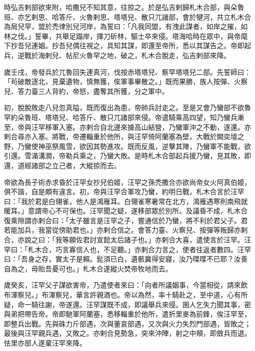 \begin{pinyinscope}
 時弘吉剌部欲來附，哈撒兒不知其意，往掠之。於是弘吉剌歸札木合部，與朵魯班、亦乞剌思、哈答斤、火魯剌思、塔塔兒、散只兀諸部，會於犍河，共立札木合為局兒罕，盟於禿律別兒河岸，為誓曰：「凡我同盟，有洩此謀者，如岸之摧，如林之伐。」誓畢，共舉足蹋岸，揮刀斫林，驅士卒來侵。塔海哈時在眾中，與帝麾下抄吾兒連姻。抄吾兒偶往視之，具知其謀，即還至帝所，悉以其謀告之。帝即起兵，逆戰於海剌兒、帖尼火魯罕之地，破之，札木合脫走，弘吉剌部來降。



 歲壬戌，帝發兵於兀魯回失連真河，伐按赤塔塔兒、察罕塔塔兒二部。先誓師曰：「茍破敵逐北，見棄遺物，慎無獲，俟軍事畢散之。」既而果勝，族人按彈、火察兒、答力臺三人背約，帝怒，盡奪其所獲，分之軍中。



 初，脫脫敗走八兒忽真隘，既而復出為患，帝帥兵討走之。至是又會乃蠻部不欲魯罕約朵魯班、塔塔兒、哈答斤、散只兀諸部來侵。帝遣騎乘高四望，知乃蠻兵漸至，帝與汪罕移軍入塞。亦剌合自北邊來據高山結營，乃蠻軍沖之不動，遂還。亦剌合尋亦入塞。將戰，帝遷輜重於他所，與汪罕倚阿蘭塞為壁，大戰於闕奕壇之野，乃蠻使神巫祭風雪，欲因其勢進攻。既而反風，逆擊其陣，乃蠻軍不能戰，欲引還。雪滿溝澗，帝勒兵乘之，乃蠻大敗。是時札木合部起兵援乃蠻，見其敗，即還，道經諸部之立己者，大縱掠而去。



 帝欲為長子術赤求昏於汪罕女抄兒伯姬，汪罕之孫禿撒合亦欲尚帝女火阿真伯姬，俱不諧，自是頗有違言。初，帝與汪罕合軍攻乃蠻，約明日戰，札木合言於汪罕曰：「我於君是白翎雀，他人是鴻雁耳。白翎雀寒暑常在北方，鴻雁遇寒則南飛就暖耳。」意謂帝心不可保也。汪罕聞之疑，遂移部眾於別所。及議昏不成，札木合復乘隙謂亦剌合曰：「太子雖言是汪罕之子，嘗通信於乃蠻，將不利於君父子。君若能加兵，我當從傍助君也。」亦剌合信之。會答力臺、火察兒、按彈等叛歸亦剌合，亦說之曰：「我等願佐君討宣懿太后諸子也。」亦剌合大喜，遣使言於汪罕。汪罕曰：「札木合，巧言寡信人也，不足聽。」亦剌合力言之，使者往返者數四。汪罕曰：「吾身之存，實太子是賴。髭須已白，遺骸冀得安寢，汝乃喋喋不已耶？汝善自為之，毋貽吾憂可也。」札木合遂縱火焚帝牧地而去。



 歲癸亥，汪罕父子謀欲害帝，乃遣使者來曰：「向者所議姻事，今當相從，請來飲布渾察兒。」布渾察兒，華言許親酒也。帝以為然，率十騎赴之，至中道，心有所疑，命一騎往謝，帝遂還。汪罕謀既不成，即議舉兵來侵。圉人乞失力聞其事，密與弟把帶告帝。帝即馳軍阿蘭塞，悉移輜重於他所，遣折里麥為前鋒，俟汪罕至，即整兵出戰。先與硃力斤部遇，次與董哀部遇，又次與火力失烈門部遇，皆敗之；最後與汪罕親兵遇，又敗之。亦剌合見勢急，突來沖陣，射之中頰，即斂兵而退。怯里亦部人遂棄汪罕來降。




\end{pinyinscope}
